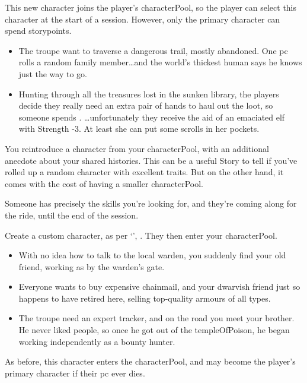 \begin{multicols}{2}
This new character joins the player's \gls{characterPool}, so the player can select this character at the start of a session.
However, only the primary character can spend \glspl{storypoint}.

\begin{itemize}
  \item
  The troupe want to traverse a dangerous trail, mostly abandoned.
  One \gls{pc} rolls a random family member\ldots and the world's thickest human says he knows just the way to go.
  \item
  Hunting through all the treasures lost in the sunken library, the players decide they really need an extra pair of hands to haul out the loot, so someone spends .
  \ldots unfortunately they receive the aid of an emaciated elf with Strength -3.
  At least she can put some scrolls in her pockets.
\end{itemize}

\label{returnFriend}
You reintroduce a character from your \gls{characterPool}, with an additional anecdote about your shared histories.
This can be a useful Story to tell if you've rolled up a random character with excellent \glspl{trait}.
But on the other hand, it comes with the cost of having a smaller \gls{characterPool}.

\label{designCharacter}
Someone has precisely the skills you're looking for, and they're coming along for the ride, until the end of the session.

Create a custom character, as per `', .
They then enter your \gls{characterPool}.

\begin{itemize}
  \item
  With no idea how to talk to the local \gls{warden}, you suddenly find your old friend, working as  by the \gls{warden}'s gate.
  \item
  Everyone wants to buy expensive chainmail, and your dwarvish friend just so happens to have retired here, selling top-quality armours of all types.
  \item
  The troupe need an expert tracker, and on the road you meet your brother.
  He never liked people, so once he got out of the \gls{templeOfPoison}, he began working independently as a bounty hunter.
\end{itemize}

As before, this character enters the \gls{characterPool}, and may become the player's primary character if their \gls{pc} ever dies.


\end{multicols}
